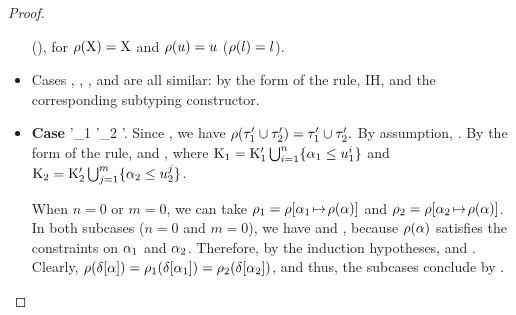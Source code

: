 \begin{proof}
\begin{itemize}
             (), for $\rho(\mathrm{X}) = \mathrm{X}$
            and $\rho(u) = u$ ($\rho(l) = l$).
        \item Cases , , , and 
            are all similar: by the form of the rule, IH, and the corresponding subtyping
            constructor.
        \item \textbf{Case } 
            {\CSet'_1 \cup \CSet'_2 \cup \CSet'}.
            Since , we have
            $\rho(\tau'_1 \cup \tau'_2) = \tau'_1 \cup \tau'_2.$
            By assumption,
            .
            By the form of the rule, 
            and
            ,
            where $\mathrm{K}_1 = \mathrm{K}'_1 \textstyle\bigcup_{i=1}^n \{\alpha_1 \leq u_1^i\}$
            and $\mathrm{K}_2 = \mathrm{K}'_2 \textstyle\bigcup_{j=1}^m \{\alpha_2 \leq u_2^j\}$.
            
            When $n=0$ or $m=0$, we can take $\rho_1 = 
                \rho[\alpha_1\!\mapsto\!\rho(\alpha)]$
            and $\rho_2 = 
                \rho[\alpha_2\!\mapsto\!\rho(\alpha)]$.
            In both subcases ($n=0$ and $m=0$), we have 
             and
            , because $\rho(\alpha)$
            satisfies the constraints on $\alpha_1$ and $\alpha_2$.
            Therefore, by the induction hypotheses,
            and
            .
            Clearly, $\rho(\delta[\alpha]) = 
                \rho_1(\delta[\alpha_1]) = 
                \rho_2(\delta[\alpha_2])$,
            and thus, the subcases conclude by .


\end{itemize}
\end{proof}
